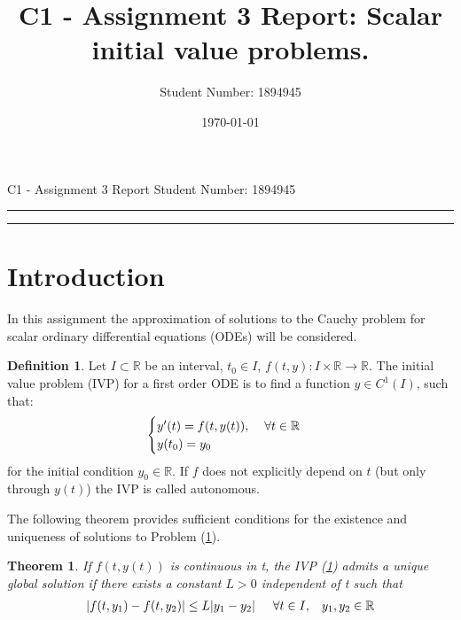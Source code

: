 \documentclass[11pt]{article}
\title{C1 - Assignment 3 Report: Scalar initial value problems.} %
\author{Student Number: 1894945} %
\date{\today} %
\theoremstyle{theorem}
\newtheorem{theorem}{Theorem}
\theoremstyle{definition}
\newtheorem{definition}{Definition}
\begin{document}
\maketitle %

\begin{center}
C1 - Assignment 3 Report \hfill
Student Number: 1894945
\vspace{3pt} \hrule \vspace{3pt} \hrule
\end{center}

\tableofcontents

\clearpage



\section{Introduction}
In this assignment the approximation of solutions to the Cauchy problem
for scalar ordinary differential equations (ODEs) will be considered.

\begin{definition}
	\label{def:Cauchy-prob}
	Let $I\subset\mathbb{R}$ be an interval, $t_0\in I$, $f(t,y):I\times\mathbb{R}\rightarrow\mathbb{R}$. The initial value problem (IVP) for a first order ODE is to find a function $y\in C^1(I)$, such that:
	\begin{align}
		\label{eqn:Cauchy-prob}
		\begin{cases}
		y'(t)=f(t,y(t)),\hspace{4mm}\forall t\in\mathbb{R}\\
		y(t_0)=y_0
		\end{cases}
	\end{align} 
	for the initial condition $y_0\in\mathbb{R}$. If $f$ does not explicitly depend on
	$t$ (but only through $y(t)$) the IVP is called autonomous.
\end{definition}

The following theorem provides sufficient conditions for the existence and uniqueness of solutions to Problem (\ref{def:Cauchy-prob}).\\

\begin{theorem}
	\label{thm:Picard}
	If $f(t,y(t))$ is continuous in t, the IVP (\ref{def:Cauchy-prob}) admits a unique global solution if there exists a constant $L>0$ independent of t such that
	\begin{align}
		\label{eqn:Lipschitz}
		|f(t,y_1)-f(t,y_2)|\le L|y_1-y_2|\hspace{5mm}\forall t\in I,\hspace{3mm} y_1,y_2\in\mathbb{R}
	\end{align}
\end{theorem}
\end{document}
